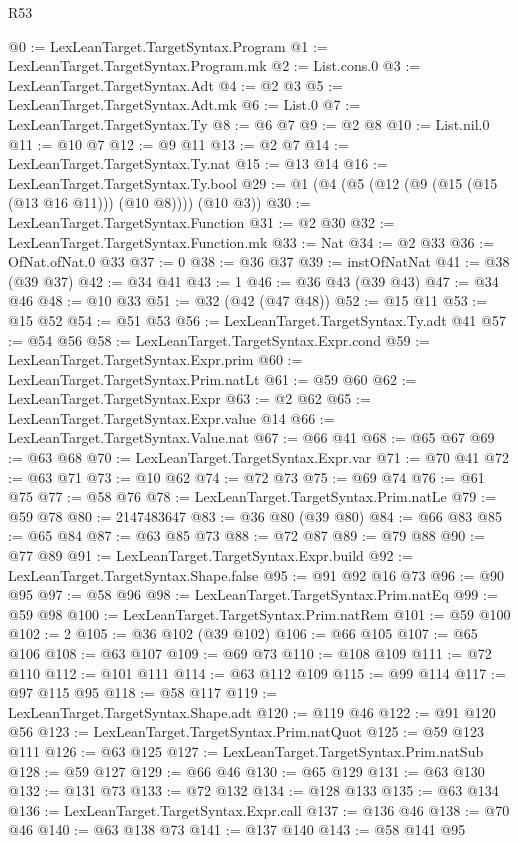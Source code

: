 \begin{lexlean}{R53}
\begin{coremodule}
@0 := LexLeanTarget.TargetSyntax.Program
@1 := LexLeanTarget.TargetSyntax.Program.mk
@2 := List.cons.{0}
@3 := LexLeanTarget.TargetSyntax.Adt
@4 := @2 @3
@5 := LexLeanTarget.TargetSyntax.Adt.mk
@6 := List.{0}
@7 := LexLeanTarget.TargetSyntax.Ty
@8 := @6 @7
@9 := @2 @8
@10 := List.nil.{0}
@11 := @10 @7
@12 := @9 @11
@13 := @2 @7
@14 := LexLeanTarget.TargetSyntax.Ty.nat
@15 := @13 @14
@16 := LexLeanTarget.TargetSyntax.Ty.bool
@29 := @1 (@4 (@5 (@12 (@9 (@15 (@15 (@13 @16 @11))) (@10 @8)))) (@10 @3))
@30 := LexLeanTarget.TargetSyntax.Function
@31 := @2 @30
@32 := LexLeanTarget.TargetSyntax.Function.mk
@33 := Nat
@34 := @2 @33
@36 := OfNat.ofNat.{0} @33
@37 := 0
@38 := @36 @37
@39 := instOfNatNat
@41 := @38 (@39 @37)
@42 := @34 @41
@43 := 1
@46 := @36 @43 (@39 @43)
@47 := @34 @46
@48 := @10 @33
@51 := @32 (@42 (@47 @48))
@52 := @15 @11
@53 := @15 @52
@54 := @51 @53
@56 := LexLeanTarget.TargetSyntax.Ty.adt @41
@57 := @54 @56
@58 := LexLeanTarget.TargetSyntax.Expr.cond
@59 := LexLeanTarget.TargetSyntax.Expr.prim
@60 := LexLeanTarget.TargetSyntax.Prim.natLt
@61 := @59 @60
@62 := LexLeanTarget.TargetSyntax.Expr
@63 := @2 @62
@65 := LexLeanTarget.TargetSyntax.Expr.value @14
@66 := LexLeanTarget.TargetSyntax.Value.nat
@67 := @66 @41
@68 := @65 @67
@69 := @63 @68
@70 := LexLeanTarget.TargetSyntax.Expr.var
@71 := @70 @41
@72 := @63 @71
@73 := @10 @62
@74 := @72 @73
@75 := @69 @74
@76 := @61 @75
@77 := @58 @76
@78 := LexLeanTarget.TargetSyntax.Prim.natLe
@79 := @59 @78
@80 := 2147483647
@83 := @36 @80 (@39 @80)
@84 := @66 @83
@85 := @65 @84
@87 := @63 @85 @73
@88 := @72 @87
@89 := @79 @88
@90 := @77 @89
@91 := LexLeanTarget.TargetSyntax.Expr.build
@92 := LexLeanTarget.TargetSyntax.Shape.false
@95 := @91 @92 @16 @73
@96 := @90 @95
@97 := @58 @96
@98 := LexLeanTarget.TargetSyntax.Prim.natEq
@99 := @59 @98
@100 := LexLeanTarget.TargetSyntax.Prim.natRem
@101 := @59 @100
@102 := 2
@105 := @36 @102 (@39 @102)
@106 := @66 @105
@107 := @65 @106
@108 := @63 @107
@109 := @69 @73
@110 := @108 @109
@111 := @72 @110
@112 := @101 @111
@114 := @63 @112 @109
@115 := @99 @114
@117 := @97 @115 @95
@118 := @58 @117
@119 := LexLeanTarget.TargetSyntax.Shape.adt
@120 := @119 @46
@122 := @91 @120 @56
@123 := LexLeanTarget.TargetSyntax.Prim.natQuot
@125 := @59 @123 @111
@126 := @63 @125
@127 := LexLeanTarget.TargetSyntax.Prim.natSub
@128 := @59 @127
@129 := @66 @46
@130 := @65 @129
@131 := @63 @130
@132 := @131 @73
@133 := @72 @132
@134 := @128 @133
@135 := @63 @134
@136 := LexLeanTarget.TargetSyntax.Expr.call
@137 := @136 @46
@138 := @70 @46
@140 := @63 @138 @73
@141 := @137 @140
@143 := @58 @141 @95

\end{coremodule}
\end{lexlean}
